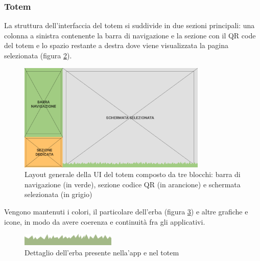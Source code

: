\begin{figure}[h]
{        \label{fig:uploadinData}
    }
    \caption{}
    \label{fig:shareDataApp}
\end{figure}

\subsubsection{Totem}
La struttura dell'interfaccia del totem si suddivide in due sezioni principali: una colonna a sinistra contenente la barra di navigazione e la sezione con il QR code del totem e lo spazio restante a destra dove viene visualizzata la pagina selezionata (figura \ref{fig:viewStruct}).
\begin{figure}
    \centering
    \includegraphics[width=0.8\textwidth]{img/totem/mainStructure.png}
    \caption{Layout generale della UI del totem composto da tre blocchi: barra di navigazione (in verde), sezione codice QR (in arancione) e schermata selezionata (in grigio)}
    \label{fig:viewStruct}
\end{figure}

Vengono mantenuti i colori, il particolare dell'erba (figura \ref{fig:grassDetails}) e altre grafiche e icone, in modo da avere coerenza e continuità fra gli applicativi.
\begin{figure}
    \centering
    \includegraphics[width=0.4\textwidth]{img/totem/grassDetail.png}
    \caption{Dettaglio dell'erba presente nella'app e nel totem}
    \label{fig:grassDetails}
\end{figure}

